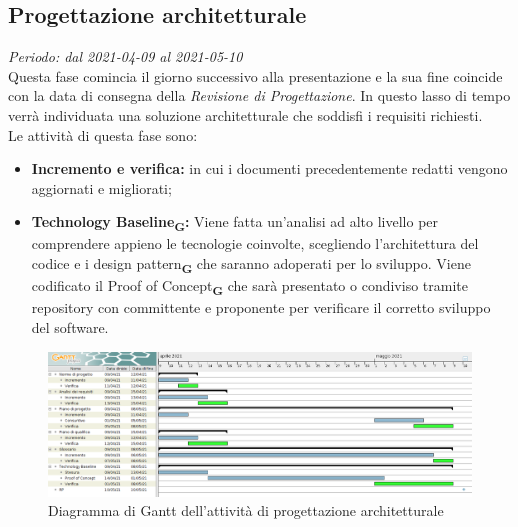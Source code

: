     \subsection{Progettazione architetturale}
        \textit{Periodo: dal 2021-04-09 al 2021-05-10}\\
        Questa fase comincia il giorno successivo alla presentazione e la sua fine coincide con la data di consegna della \textit{Revisione di Progettazione}. In questo lasso di tempo verrà individuata una soluzione architetturale che soddisfi i requisiti richiesti.\\
        Le attività di questa fase sono:
        \begin {itemize}
            \item \textbf{Incremento e verifica:} in cui i documenti precedentemente redatti vengono aggiornati e migliorati;
            \item \textbf{Technology Baseline\textsubscript{\textbf{G}}:} Viene fatta un’analisi ad alto livello per comprendere appieno le tecnologie coinvolte, scegliendo l’architettura del codice e i design pattern\textsubscript{\textbf{G}} che saranno adoperati per lo sviluppo. Viene codificato il Proof of Concept\textsubscript{\textbf{G}} che sarà presentato o condiviso tramite repository con committente e proponente per verificare il corretto sviluppo del software.
        \end {itemize}
        \begin{figure}[!ht]
            \caption{Diagramma di Gantt dell’attività di progettazione architetturale}
            \vspace{5px}
            \includegraphics[scale=0.3]{../../../Images/Diagrammi/Gantt/progettArchitetturale.png}
            \centering
        \end{figure}

